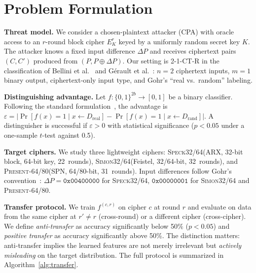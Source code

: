 \documentclass[runningheads]{llncs}
\newcommand{\speck}{\textsc{Speck32/64}\xspace}
\newcommand{\simon}{\textsc{Simon32/64}\xspace}
\newcommand{\present}{\textsc{Present-64/80}\xspace}
\begin{document}
\section{Problem Formulation}
\label{sec:problem}

\textbf{Threat model.}
We consider a chosen-plaintext attacker (CPA) with oracle access to an $r$-round block cipher $E^r_K$ keyed by a uniformly random secret key $K$.
The attacker knows a fixed input difference $\Delta P$ and receives ciphertext pairs $(C, C')$ produced from $(P, P \oplus \Delta P)$.
Our setting is 2-1-CT-R in the classification of Bellini et al.~\cite{bellini2023dbitnet} and Gérault et al.~\cite{gerault2024sok}: $n{=}2$ ciphertext inputs, $m{=}1$ binary output, ciphertext-only input type, and Gohr's ``real vs.\ random'' labeling.

\textbf{Distinguishing advantage.}
Let $f: \{0,1\}^{2b} \to [0,1]$ be a binary classifier.
Following the standard formulation~\cite{gohr2019}, the advantage is
$\varepsilon = |\Pr[f(x){=}1 \mid x \leftarrow D_{\text{real}}] - \Pr[f(x){=}1 \mid x \leftarrow D_{\text{rand}}]|$.
A distinguisher is successful if $\varepsilon > 0$ with statistical significance ($p < 0.05$ under a one-sample $t$-test against 0.5).

\textbf{Target ciphers.}
We study three lightweight ciphers:
\speck (ARX, 32-bit block, 64-bit key, 22~rounds),
\simon (Feistel, 32/64-bit, 32~rounds), and
\present (SPN, 64/80-bit, 31~rounds).
Input differences follow Gohr's convention~\cite{gohr2019}: $\Delta P{=}\texttt{0x00400000}$ for \speck, $\texttt{0x00000001}$ for \simon and \present.

\textbf{Transfer protocol.}
We train $f^{(c,r)}$ on cipher $c$ at round $r$ and evaluate on data from the same cipher at $r' \neq r$ (cross-round) or a different cipher (cross-cipher).
We define \emph{anti-transfer} as accuracy significantly below 50\% ($p < 0.05$) and \emph{positive transfer} as accuracy significantly above 50\%.
The distinction matters: anti-transfer implies the learned features are not merely irrelevant but \emph{actively misleading} on the target distribution.
The full protocol is summarized in Algorithm~\ref{alg:transfer}.
\end{document}
